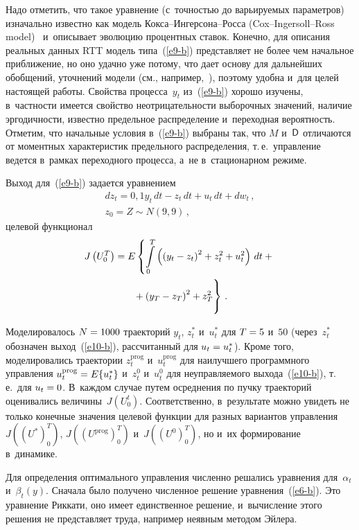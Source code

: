 \begin{multicols}{2}
     Надо отметить, что такое уравнение (с~точ\-ностью до варьируемых 
параметров) изначально известно как модель Кок\-са--Ин\-гер\-со\-на--Рос\-са 
(Cox--Ingersoll--Ross model)~\cite{4-b} и~описывает эволюцию процентных 
ставок. Конечно, для описания реальных данных RTT модель  
типа~(\ref{e9-b}) представляет не более чем начальное приближение, но оно 
удачно уже потому, что дает основу для дальнейших обобщений, уточнений 
модели (см., например,~\cite{5-b}), поэтому удобна и~для целей настоящей 
работы. Свойства процесса~$y_t$ из~(\ref{e9-b}) хорошо изучены, 
в~частности имеется свойство неотрицательности выборочных значений, 
наличие эргодичности, известно предельное распределение и~переходная 
вероятность. Отметим, что начальные условия в~(\ref{e9-b}) выбраны так, 
что $M$ и~${\sf D}$ отличаются от моментных характеристик предельного 
распределения, т.\,е.\ управление ведется в~рамках переходного процесса, 
а~не в~стационарном режиме.
     
     Выход для~(\ref{e9-b}) задается уравнением
          \begin{multline}
     dz_t=0{,}1 y_t\, dt-z_t \,dt+u_t \,dt+dw_t\,,\\ z_0=Z\sim N(9, 9)\,,
     \label{e10-b}
     \end{multline}
    целевой функционал
\begin{multline*}
J\left( U_0^T\right) =E\left\{ \int\limits_0^T \left( \left( y_t-
z_t\right)^2+z_t^2+u_t^2\right) \,dt +{}\right.\\
\left.{}+\left( y_T -z_T\right)^2+z_T^2
     \vphantom{\int\limits_0^T}
     \right\}\,.
\end{multline*}
     
     Моделировалось $N\hm=1000$ траекторий $y_t$, $z_t^*$ и~$u_t^*$ для 
$T\hm=5$ и~$50$ (через~$z_t^*$ обозначен выход~(\ref{e10-b}), рассчитанный 
для $u_t\hm=u_t^*$). Кроме того, моделировались траектории $z_t^{\mathrm{prog}}$ 
и~$u_t^{\mathrm{prog}}$ для наилучшего программного управления $u_t^{\mathrm{prog}}\hm= E\{ 
u_t^*\}$ и~$z_t^0$ и~$u_t^0$ для неуправляемого выхода~(\ref{e10-b}), т.\,е.\ для 
$u_t\hm=0$. В~каждом случае путем осреднения по пучку траекторий 
оценивались величины~$J(U_0^t)$. Соответственно, в~результате можно 
увидеть не только конечные значения целевой функции для разных 
вариантов управления $J((U^*)_0^T)$, $J((U^{\mathrm{prog}})_0^T)$ и~$J((U^0)_0^T)$, 
но и~их формирование в~динамике.
     
     Для определения оптимального управления чис\-лен\-но решались 
уравнения для~$\alpha_t$ и~$\beta_t(y)$. Сначала было получено чис\-лен\-ное 
решение урав\-не\-ния~(\ref{e6-b}). Это уравнение Риккати, оно имеет 
единственное решение, и~вы\-чис\-ле\-ние этого решения не пред\-став\-ля\-ет труда, 
например неявным методом Эйлера.
     

\end{multicols}
